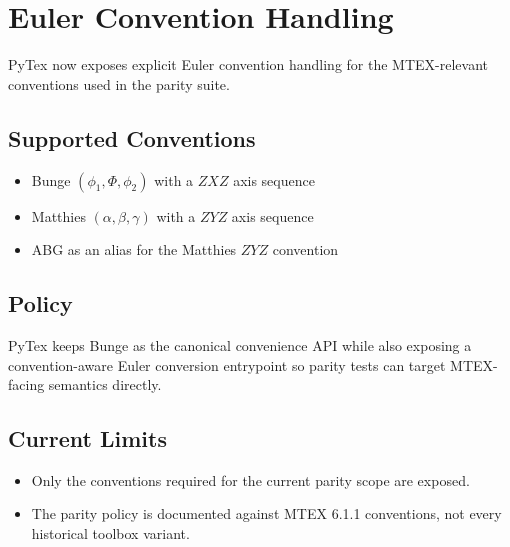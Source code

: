 \section{Euler Convention Handling}

PyTex now exposes explicit Euler convention handling for the MTEX-relevant conventions used in the parity suite.

\subsection{Supported Conventions}

\begin{itemize}
  \item Bunge \((\phi_1,\Phi,\phi_2)\) with a \(Z X Z\) axis sequence
  \item Matthies \((\alpha,\beta,\gamma)\) with a \(Z Y Z\) axis sequence
  \item ABG as an alias for the Matthies \(Z Y Z\) convention
\end{itemize}

\subsection{Policy}

PyTex keeps Bunge as the canonical convenience API while also exposing a convention-aware Euler conversion entrypoint so parity tests can target MTEX-facing semantics directly.

\subsection{Current Limits}

\begin{itemize}
  \item Only the conventions required for the current parity scope are exposed.
  \item The parity policy is documented against MTEX 6.1.1 conventions, not every historical toolbox variant.
\end{itemize}
